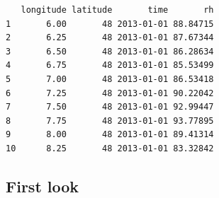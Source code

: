 \documentclass[
  letterpaper,
  DIV=11,
  numbers=noendperiod]{scrartcl}
\newenvironment{Shaded}{\begin{snugshade}}{\end{snugshade}}
\newcommand{\CommentTok}[1]{\textcolor[rgb]{0.37,0.37,0.37}{#1}}
\newcommand{\ControlFlowTok}[1]{\textcolor[rgb]{0.00,0.23,0.31}{\textbf{#1}}}
\newcommand{\DecValTok}[1]{\textcolor[rgb]{0.68,0.00,0.00}{#1}}
\newcommand{\NormalTok}[1]{\textcolor[rgb]{0.00,0.23,0.31}{#1}}
\newcommand{\OtherTok}[1]{\textcolor[rgb]{0.00,0.23,0.31}{#1}}
\newcommand{\SpecialCharTok}[1]{\textcolor[rgb]{0.37,0.37,0.37}{#1}}
\begin{document}
\begin{verbatim}
   longitude latitude       time       rh
1       6.00       48 2013-01-01 88.84715
2       6.25       48 2013-01-01 87.67344
3       6.50       48 2013-01-01 86.28634
4       6.75       48 2013-01-01 85.53499
5       7.00       48 2013-01-01 86.53418
6       7.25       48 2013-01-01 90.22042
7       7.50       48 2013-01-01 92.99447
8       7.75       48 2013-01-01 93.77895
9       8.00       48 2013-01-01 89.41314
10      8.25       48 2013-01-01 83.32842
\end{verbatim}

\subsection{First look}\label{first-look}

\begin{Shaded}
\end{Shaded}
\end{document}
